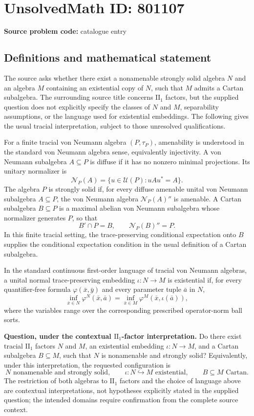 \documentclass[11pt]{article}
\begin{document}
\section*{UnsolvedMath ID: 801107}
\textbf{Source problem code:} catalogue entry
\subsection{Definitions and mathematical statement}
The source asks whether there exist a nonamenable strongly solid algebra \(N\) and an algebra \(M\) containing an existential copy of \(N\), such that \(M\) admits a Cartan subalgebra. The surrounding source title concerns \(\mathrm{II}_1\) factors, but the supplied question does not explicitly specify the classes of \(N\) and \(M\), separability assumptions, or the language used for existential embeddings. The following gives the usual tracial interpretation, subject to those unresolved qualifications.

For a finite tracial von Neumann algebra \((P,\tau_P)\), amenability is understood in the standard von Neumann algebra sense, equivalently injectivity. A von Neumann subalgebra \(A\subseteq P\) is diffuse if it has no nonzero minimal projections. Its unitary normalizer is
\[
\mathcal N_P(A)=\{u\in\mathcal U(P):uAu^*=A\}.
\]
The algebra \(P\) is strongly solid if, for every diffuse amenable unital von Neumann subalgebra \(A\subseteq P\), the von Neumann algebra \(\mathcal N_P(A)''\) is amenable. A Cartan subalgebra \(B\subseteq P\) is a maximal abelian von Neumann subalgebra whose normalizer generates \(P\), so that
\[
B'\cap P=B,\qquad \mathcal N_P(B)''=P.
\]
In this finite tracial setting, the trace-preserving conditional expectation onto \(B\) supplies the conditional expectation condition in the usual definition of a Cartan subalgebra.

In the standard continuous first-order language of tracial von Neumann algebras, a unital normal trace-preserving embedding \(\iota:N\to M\) is existential if, for every quantifier-free formula \(\varphi(\bar x,\bar y)\) and every parameter tuple \(\bar a\) in \(N\),
\[
\inf_{\bar x\in N}\varphi^N(\bar x,\bar a)
=
\inf_{\bar x\in M}\varphi^M(\bar x,\iota(\bar a)),
\]
where the variables range over the corresponding prescribed operator-norm ball sorts.

\textbf{Question, under the contextual \(\mathrm{II}_1\)-factor interpretation.} Do there exist tracial \(\mathrm{II}_1\) factors \(N\) and \(M\), an existential embedding \(\iota:N\to M\), and a Cartan subalgebra \(B\subseteq M\), such that \(N\) is nonamenable and strongly solid? Equivalently, under this interpretation, the requested configuration is
\[
N\text{ nonamenable and strongly solid},\qquad
\iota:N\hookrightarrow M\text{ existential},\qquad
B\subseteq M\text{ Cartan}.
\]
The restriction of both algebras to \(\mathrm{II}_1\) factors and the choice of language above are contextual interpretations, not hypotheses explicitly stated in the supplied question; the intended domains require confirmation from the complete source context.
\end{document}
